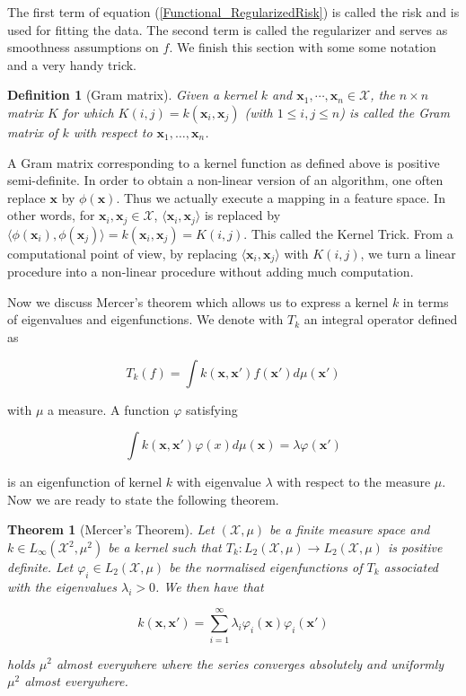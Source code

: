 \documentclass[12pt,a4paper,oneside]{book}
\newtheorem{Definition}{Definition}
\newtheorem{Theorem}{Theorem}
\begin{document}
The first term of equation (\ref{Functional_RegularizedRisk}) is called the risk and is used for fitting the data. The second term is called the regularizer and serves as smoothness assumptions on $f$. We finish this section with some some notation and a very handy trick.

\begin{Definition}[Gram matrix]
Given a kernel $k$ and $\bm{x}_1,\cdots,\bm{x}_n \in \mathcal{X}$, the $n \times n$ matrix $K$ for which $K(i,j) = k(\bm{x}_i,\bm{x}_j)$ (with $1\leq i,j\leq n$) is called the Gram matrix of $k$ with respect to $\bm{x}_1, \ldots, \bm{x}_n$.
\end{Definition}

A Gram matrix corresponding to a kernel function as defined above is positive semi-definite. In order to obtain a non-linear version of an algorithm, one often replace $\bm{x}$ by $\phi(\bm{x})$. Thus we actually execute a mapping in a feature space. In other words, for $\bm{x}_i,\bm{x}_j \in \mathcal{X}$, $\langle \bm{x}_i, \bm{x}_j \rangle$ is replaced by $\langle \phi (\bm{x}_i) , \phi (\bm{x}_j) \rangle =k(\bm{x}_i,\bm{x}_j) = K(i,j)$. This called the Kernel Trick. From a computational point of view, by replacing $\langle \bm{x}_i, \bm{x}_j \rangle$ with $K(i,j)$, we turn a linear procedure into a non-linear procedure without adding much computation. 

Now we discuss Mercer's theorem which allows us to express a kernel $k$ in terms of eigenvalues and eigenfunctions. We denote with $T_k$  an integral operator defined as 

\begin{equation}
T_k (f) = \int k(\bm{x}, \bm{x}') f(\bm{x}') d \mu(\bm{x}')
\end{equation}

with $\mu$ a measure. A function $\varphi$ satisfying 

\begin{equation}
\int k(\bm{x},\bm{x}') \varphi(x) d \mu(\bm{x}) = \lambda \varphi(\bm{x}')
\end{equation}

is an eigenfunction of kernel $k$ with eigenvalue $\lambda$ with respect to the measure $\mu$. Now we are ready to state the following theorem.

\begin{Theorem}[Mercer's Theorem]\label{Functional_mercer}
Let $(\mathcal{X}, \mu)$ be a finite measure space and $k \in L_{\infty} (\mathcal{X}^2, \mu^2)$ be a kernel such that $T_k : L_2(\mathcal{X}, \mu) \rightarrow L_2(\mathcal{X}, \mu)$ is positive definite. Let $\varphi_i \in L_2(\mathcal{X},\mu)$ be the normalised eigenfunctions of $T_k$ associated with the eigenvalues $\lambda_i > 0$. We then have that 

\begin{equation}
k(\bm{x},\bm{x}') = \sum\limits_{i=1}^{\infty} \lambda_i \varphi_i(\bm{x}) \varphi_i(\bm{x}')
\end{equation}

holds $\mu^2$ almost everywhere where the series converges absolutely and uniformly $\mu^2$ almost everywhere.
\end{Theorem}
\end{document}
